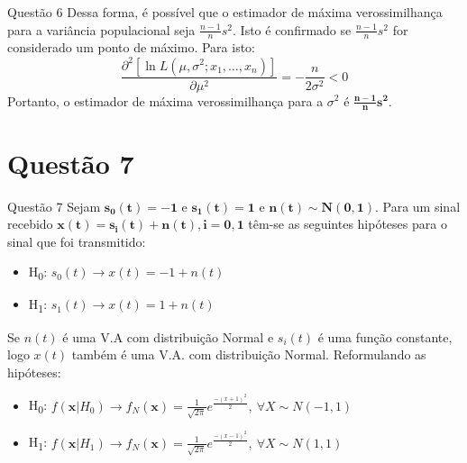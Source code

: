 \documentclass{beamer}\usepackage[]{graphicx}\usepackage[]{color}
\begin{document}
		\begin{frame}{Questão 6}
			Dessa forma, é possível que o estimador de máxima verossimilhança para a variância populacional seja $ \frac{n-1}{n}s^{2}$.  Isto é confirmado se $ \frac{n-1}{n}s^{2}$ for considerado um ponto de máximo.  Para isto:
			$$\frac{\partial^{2}[ \ln   L(\mu,\sigma^{2};x_{1},\dots,x_{n})]}{\partial \mu^{2}}  = -\frac{n}{2\sigma^2} < 0 $$
			Portanto, o estimador de máxima verossimilhança para a $\sigma^{2}$ é $\boldsymbol{\frac{n-1}{n}s^{2}}$.
		\end{frame}
	\section{Questão 7}
		\begin{frame}{Questão 7}
			Sejam $\boldsymbol{s_{0}(t) = -1}$ e $\boldsymbol{s_{1}(t) = 1}$ e $\boldsymbol{n(t)\sim N(0,1)}$.  Para um sinal recebido $\boldsymbol{x(t) = s_{i}(t) + n(t), i={0,1}}$ têm-se as seguintes hipóteses para o sinal que foi transmitido:
			\begin{itemize}
				\item H\textsubscript{0}:  $s_{0}(t) \rightarrow x(t) = -1 + n(t)$
				\item H\textsubscript{1}:  $s_{1}(t) \rightarrow x(t) = 1 + n(t)$
			\end{itemize}
			Se $n(t)$ é uma V.A com distribuição Normal e $s_{i}(t)$ é uma função constante, logo $x(t)$ também é uma V.A. com distribuição Normal.  Reformulando as hipóteses:
			\begin{itemize}
				\item H\textsubscript{0}:  $f(\boldsymbol{x}|H_{0}) \rightarrow f_{N}(\boldsymbol{x}) = \frac{1}{\sqrt{2\pi}}e^{\frac{-(x+1)^{2}}{2}},~ \forall X \sim N(-1,1)$
				\item H\textsubscript{1}:   $f(\boldsymbol{x}|H_{1}) \rightarrow f_{N}(\boldsymbol{x}) = \frac{1}{\sqrt{2\pi}}e^{\frac{-(x-1)^{2}}{2}},~ \forall X \sim N(1,1)$
			\end{itemize}
		\end{frame}
	
\end{document}
